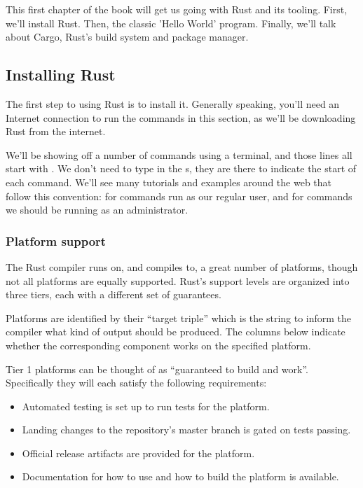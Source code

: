 This first chapter of the book will get us going with Rust and its tooling. First, we'll install Rust. Then, the classic 
'Hello World' program. Finally, we'll talk about Cargo, Rust's build system and package manager.

\subsection{Installing Rust}

The first step to using Rust is to install it. Generally speaking, you'll need an Internet connection to run the commands in 
this section, as we'll be downloading Rust from the internet.

\blank

We'll be showing off a number of commands using a terminal, and those lines all start with \code{\$}. We don't need to type in the 
\code{\$}s, they are there to indicate the start of each command. We'll see many tutorials and examples around the web that follow 
this convention: \code{\$} for commands run as our regular user, and \code{\#} for commands we should be running as an administrator.

\subsubsection*{Platform support}

The Rust compiler runs on, and compiles to, a great number of platforms, though not all platforms are equally supported. 
Rust's support levels are organized into three tiers, each with a different set of guarantees.

\blank

Platforms are identified by their \enquote{target triple} which is the string to inform the compiler what kind of output should 
be produced. The columns below indicate whether the corresponding component works on the specified platform.


Tier 1 platforms can be thought of as \enquote{guaranteed to build and work}. Specifically they will each satisfy the 
following requirements:

\begin{itemize}
    \item{Automated testing is set up to run tests for the platform.}
    \item{Landing changes to the  repository's master branch is gated on tests passing.}
    \item{Official release artifacts are provided for the platform.}
    \item{Documentation for how to use and how to build the platform is available.}
\end{itemize}

